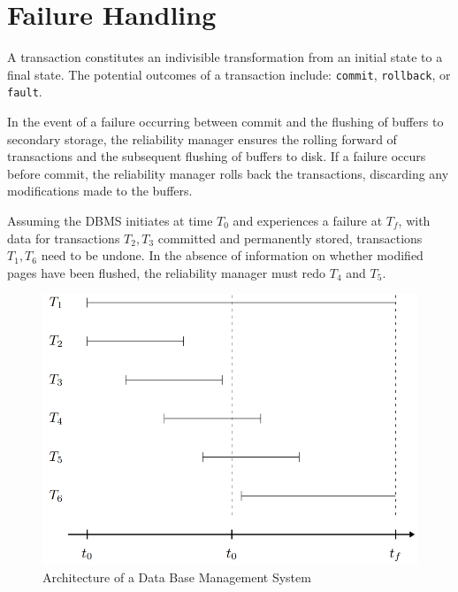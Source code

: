\section{Failure Handling}

A transaction constitutes an indivisible transformation from an initial state to a final state. 
The potential outcomes of a transaction include: \texttt{commit}, \texttt{rollback}, or \texttt{fault}.

In the event of a failure occurring between commit and the flushing of buffers to secondary storage, the reliability manager ensures the rolling forward of transactions and the subsequent flushing of buffers to disk. 
If a failure occurs before commit, the reliability manager rolls back the transactions, discarding any modifications made to the buffers.
\begin{example}
    Assuming the DBMS initiates at time $T_0$ and experiences a failure at $T_f$, with data for transactions $T_2,T_3$ committed and permanently stored, transactions $T_1,T_6$ need to be undone.
    In the absence of information on whether modified pages have been flushed, the reliability manager must redo $T_4$ and $T_5$.
    \begin{figure}[H]
        \centering
        \includegraphics[width=0.5\linewidth]{images/tar.png}
        \caption{Architecture of a Data Base Management System}
    \end{figure}
\end{example}

